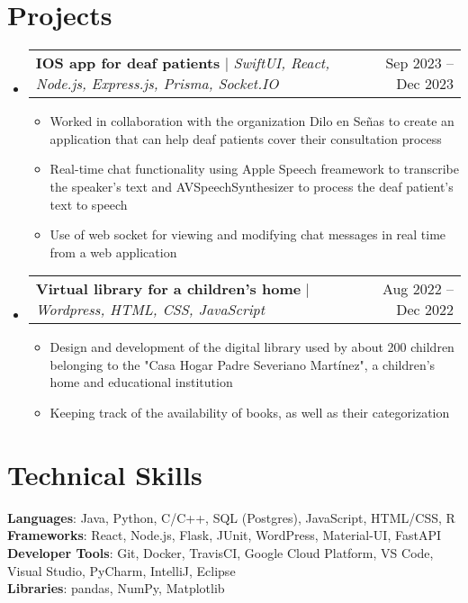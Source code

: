 \documentclass[letterpaper,11pt]{article}
\makeatletter
\newcommand{\resumeItem}[1]{
    \item\small{
            {#1 \vspace{-2pt}}
    }
}
\newcommand{\resumeProjectHeading}[2]{
    \item
    \begin{tabular*}{0.97\textwidth}{l@{\extracolsep{\fill}}r}
        \small#1 & #2 \\
    \end{tabular*}\vspace{-7pt}
}
\newcommand{\resumeSubHeadingListStart}{\begin{itemize}[leftmargin=0.15in, label={}]}
\newcommand{\resumeSubHeadingListEnd}{\end{itemize}}
\newcommand{\resumeItemListStart}{\begin{itemize}}
\newcommand{\resumeItemListEnd}{\end{itemize}\vspace{-5pt}}
\makeatother
\begin{document}
\section{Projects}
\resumeSubHeadingListStart
\resumeProjectHeading
{\textbf{IOS app for deaf patients} $|$ \emph{SwiftUI, React, Node.js, Express.js, Prisma, Socket.IO }}{Sep 2023 -- Dec 2023}
\resumeItemListStart
\resumeItem{Worked in collaboration with the organization Dilo en Señas to create an application that can help deaf patients cover their consultation process}
\resumeItem{Real-time chat functionality using Apple Speech freamework to transcribe the speaker's text and AVSpeechSynthesizer to process the deaf patient's text to speech}
\resumeItem{Use of web socket for viewing and modifying chat messages in real time from a web application}
\resumeItemListEnd
\resumeProjectHeading
{\textbf{Virtual library for a children's home} $|$ \emph{Wordpress, HTML, CSS, JavaScript }}{Aug 2022 -- Dec 2022}
\resumeItemListStart
\resumeItem{Design and development of the digital library used by about 200 children belonging to the "Casa Hogar Padre Severiano Martínez", a children's home and educational institution}
\resumeItem{Keeping track of the availability of books, as well as their categorization}
\resumeItemListEnd
\resumeSubHeadingListEnd



%
\section{Technical Skills}
\begin{itemize}[leftmargin=0.15in, label={}]
\small{\item{
\textbf{Languages}{: Java, Python, C/C++, SQL (Postgres), JavaScript, HTML/CSS, R} \\
\textbf{Frameworks}{: React, Node.js, Flask, JUnit, WordPress, Material-UI, FastAPI} \\
\textbf{Developer Tools}{: Git, Docker, TravisCI, Google Cloud Platform, VS Code, Visual Studio, PyCharm, IntelliJ, Eclipse} \\
\textbf{Libraries}{: pandas, NumPy, Matplotlib}
}}
\end{itemize}


\end{document}
